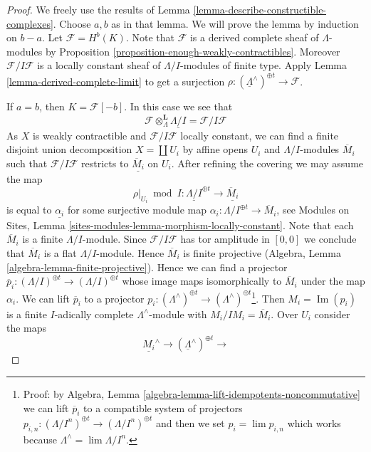 \documentclass{stacks-project}
\theoremstyle{plain}
\theoremstyle{definition}
\theoremstyle{remark}
\numberwithin{equation}{subsection}
\def\lim{\mathop{\mathrm{lim}}\nolimits}
\def\Im{\mathop{\mathrm{Im}}}
\begin{document}
\begin{proof}
We freely use the results of
Lemma \ref{lemma-describe-constructible-complexes}.
Choose $a, b$ as in that lemma. We will prove the lemma by
induction on $b - a$. Let $\mathcal{F} = H^b(K)$.
Note that $\mathcal{F}$ is a derived complete sheaf of
$\Lambda$-modules by
Proposition \ref{proposition-enough-weakly-contractibles}.
Moreover $\mathcal{F}/I\mathcal{F}$ is a locally
constant sheaf of $\Lambda/I$-modules of finite type.
Apply Lemma \ref{lemma-derived-complete-limit} to get a surjection
$\rho : (\underline{\Lambda}^\wedge)^{\oplus t} \to \mathcal{F}$.

\medskip\noindent
If $a = b$, then $K = \mathcal{F}[-b]$. In this case we see that
$$
\mathcal{F} \otimes_\Lambda^\mathbf{L} \underline{\Lambda/I} =
\mathcal{F}/I\mathcal{F}
$$
As $X$ is weakly contractible and $\mathcal{F}/I\mathcal{F}$
locally constant, we can find a finite disjoint
union decomposition $X = \coprod U_i$ by affine opens $U_i$
and $\Lambda/I$-modules $\overline{M}_i$
such that $\mathcal{F}/I\mathcal{F}$ restricts to
$\underline{\overline{M}_i}$ on $U_i$. After refining the covering
we may assume the map
$$
\rho|_{U_i} \bmod I :
\underline{\Lambda/I}^{\oplus t}
\longrightarrow
\underline{\overline{M}_i}
$$
is equal to $\underline{\alpha_i}$ for some surjective module map
$\alpha_i : \Lambda/I^{\oplus t} \to \overline{M}_i$, see
Modules on Sites, Lemma \ref{sites-modules-lemma-morphism-locally-constant}.
Note that each $\overline{M}_i$ is a finite $\Lambda/I$-module.
Since $\mathcal{F}/I\mathcal{F}$ has tor amplitude in $[0, 0]$
we conclude that $\overline{M}_i$ is a flat $\Lambda/I$-module.
Hence $\overline{M}_i$ is finite projective
(Algebra, Lemma \ref{algebra-lemma-finite-projective}).
Hence we can find a projector
$\overline{p}_i : (\Lambda/I)^{\oplus t} \to (\Lambda/I)^{\oplus t}$
whose image maps isomorphically to $\overline{M}_i$ under the map $\alpha_i$.
We can lift $\overline{p}_i$ to a projector
$p_i : (\Lambda^\wedge)^{\oplus t} \to
(\Lambda^\wedge)^{\oplus t}$\footnote{Proof: by
Algebra, Lemma \ref{algebra-lemma-lift-idempotents-noncommutative}
we can lift $\overline{p}_i$ to a compatible system of
projectors $p_{i, n} : (\Lambda/I^n)^{\oplus t} \to (\Lambda/I^n)^{\oplus t}$
and then we set $p_i = \lim p_{i, n}$ which works because
$\Lambda^\wedge = \lim \Lambda/I^n$.}.
Then $M_i = \Im(p_i)$ is a finite $I$-adically complete
$\Lambda^\wedge$-module with $M_i/IM_i = \overline{M}_i$.
Over $U_i$ consider the maps
$$
\underline{M_i}^\wedge \to
(\underline{\Lambda}^\wedge)^{\oplus t} \to
$$
\end{proof}
\end{document}
